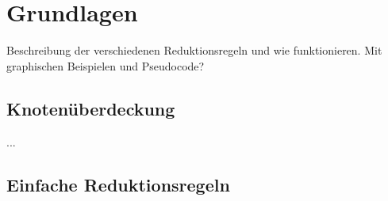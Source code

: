 
\chapter{Grundlagen}
\label{ch:Grundlagen}
Beschreibung der verschiedenen Reduktionsregeln und wie funktionieren. Mit graphischen Beispielen und Pseudocode?


\section{Knotenüberdeckung}
\label{ch:Grundlagen:sec:Knotenüberdeckung}

...
\section{Einfache Reduktionsregeln}
\label{ch:Grundlagen:sec:Einfache Reduktionsregeln}

